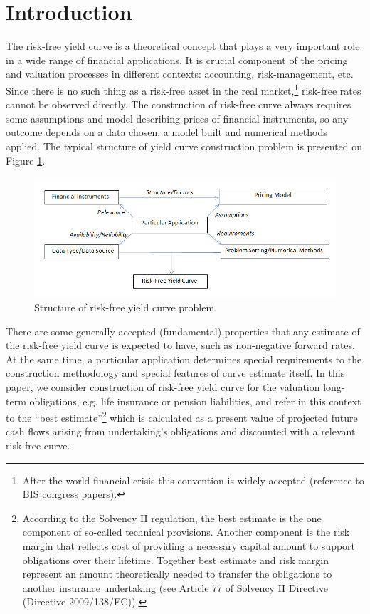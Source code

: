 \section*{Introduction}

	The risk-free yield curve is a theoretical concept that plays a very important role in a wide range of financial applications.  
	It is crucial component of the pricing and valuation processes in different contexts: accounting, risk-management, etc. 
	Since there is no such thing as a risk-free asset in the real market,\footnote
{
After the world financial crisis this convention is widely accepted (reference to BIS congress papers).
}
risk-free rates cannot be observed directly. 
	The construction of risk-free curve always requires some assumptions and model describing prices of financial instruments, so any outcome depends on a data chosen, a model built and numerical methods applied.
	The typical structure of yield curve construction problem is presented on Figure \ref{problem_structure}.

\begin{figure}[h]
	\includegraphics[width=\textwidth]{problem_structure}
	\caption{Structure of risk-free yield curve problem.}
	\label{problem_structure}
\end{figure} 


	There are some generally accepted (fundamental) properties that any estimate of the risk-free yield curve is expected to have, such as non-negative forward rates.
	 At the same time, a particular application determines special requirements to the construction methodology and special features of curve estimate itself. 
	In this paper, we consider construction of risk-free yield curve for the valuation long-term obligations, e.g. life insurance or pension liabilities, and refer in this context to the ``best estimate''\footnote
{
	According to the Solvency II regulation, the best estimate is the one component of so-called technical provisions. 
	Another component is the risk margin that reflects cost of providing a necessary capital amount to support obligations over their lifetime. 
	Together best estimate and risk margin represent an amount theoretically needed to transfer the obligations to another insurance undertaking (see Article 77 of  Solvency II Directive (Directive 2009/138/EC)).
}  
 which is calculated as a present value of projected future cash flows arising from undertaking's obligations and discounted with a relevant risk-free curve.

